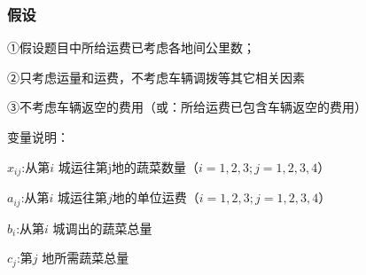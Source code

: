 \documentclass[slidestop,compress,mathserif,c]{beamer}
\begin{document}
%


\begin{frame}
  \frametitle{假设}
①假设题目中所给运费已考虑各地间公里数；

②只考虑运量和运费，不考虑车辆调拨等其它相关因素

③不考虑车辆返空的费用（或：所给运费已包含车辆返空的费用）

变量说明：

$x_{ij}$:从第$i$ 城运往第j地的蔬菜数量（$i=1,2,3;j=1,2,3,4$）

$a_{ij}$:从第$i$ 城运往第$j$地的单位运费（$ i=1,2,3;j=1,2,3,4 $）

$b_i$:从第$i$ 城调出的蔬菜总量 

$c_j$:第$j$ 地所需蔬菜总量 

\end{frame}
\end{document}
